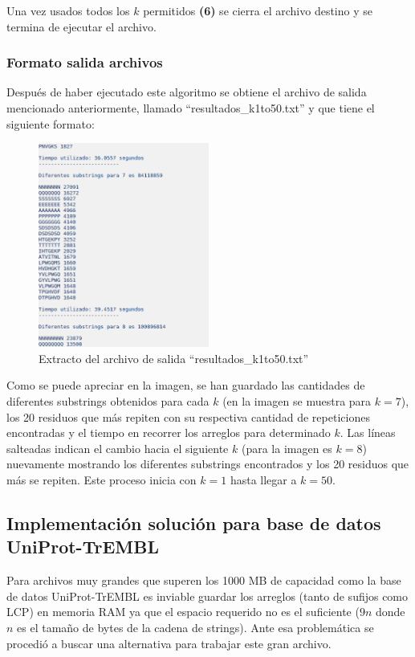 Una vez usados todos los $k$ permitidos \textbf{(6)} se cierra el archivo destino y se termina de ejecutar el archivo.

\subsubsection{Formato salida archivos}

Después de haber ejecutado este algoritmo se obtiene el archivo de salida mencionado anteriormente, llamado ``resultados\_k1to50.txt'' y que tiene el siguiente formato:

\begin{figure}[h]
    \centering
    \includegraphics[width=0.5\textwidth]{./images/formatosalidaswissprot.png}
    \caption{Extracto del archivo de salida ``resultados\_k1to50.txt''}
\end{figure}

Como se puede apreciar en la imagen, se han guardado las cantidades de diferentes substrings obtenidos para cada $k$ (en la imagen se muestra para $k = 7$), los 20 residuos que más repiten con su respectiva cantidad de repeticiones encontradas y el tiempo en recorrer los arreglos para determinado $k$. Las líneas salteadas indican el cambio hacia el siguiente $k$ (para la imagen es $k=8$) nuevamente mostrando los diferentes substrings encontrados y los 20 residuos que más se repiten. Este proceso inicia con $k=1$ hasta llegar a $k=50$.

\subsection{Implementación solución para base de datos UniProt-TrEMBL}

Para archivos muy grandes que superen los 1000 MB de capacidad como la base de datos UniProt-TrEMBL es inviable guardar los arreglos (tanto de sufijos como LCP) en memoria RAM ya que el espacio requerido no es el suficiente ($9n$ donde $n$ es el tamaño de bytes de la cadena de strings). Ante esa problemática se procedió a buscar una alternativa para trabajar este gran archivo.

